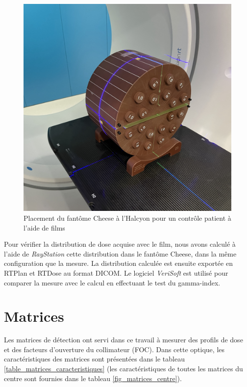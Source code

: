 \documentclass{book}
\begin{document}
\begin{figure}[h]
  \centering
  \includegraphics[scale=0.075]{figures/cheese.jpg}
  \caption{Placement du fantôme Cheese à l'Halcyon pour un contrôle patient à l'aide de films}
  \label{fig_DQP_films}
\end{figure}

Pour vérifier la distribution de dose acquise avec le film, nous avons calculé à l'aide de \textit{RayStation} cette distribution dans le fantôme Cheese, dans la même configuration que la mesure. La distribution calculée est ensuite exportée en RTPlan et RTDose au format DICOM. Le logiciel \textit{VeriSoft} est utilisé pour comparer la mesure avec le calcul en effectuant le test du gamma-index.

\newpage
\section{Matrices}

Les matrices de détection ont servi dans ce travail à mesurer des profils de dose et des facteurs d'ouverture du collimateur (FOC). Dans cette optique, les caractéristiques des matrices sont présentées dans le tableau \ref*{table_matrices_caracteristiques} (les caractéristiques de toutes les matrices du centre sont fournies dans le tableau \ref*{fig_matrices_centre}).
\end{document}
